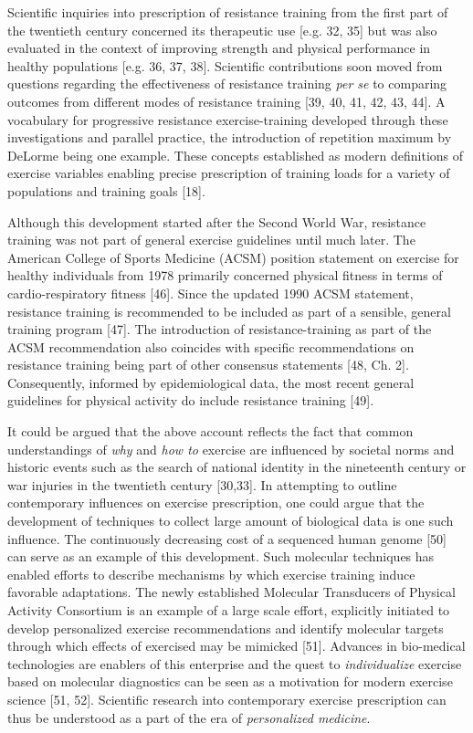 \documentclass[twoside,10pt]{gihclass} %
\begin{document}
Scientific inquiries into prescription of resistance training from the first part of the twentieth century concerned its therapeutic use
{[}e.g. 32, 35{]}
but was also evaluated in the context of improving strength and physical performance in healthy populations
{[}e.g. 36, 37, 38{]}.
Scientific contributions soon moved from questions regarding the effectiveness of resistance training \emph{per se} to comparing outcomes from different modes of resistance training
{[}39, 40, 41, 42, 43, 44{]}.
A vocabulary for progressive resistance exercise-training developed through these investigations and parallel practice,
the introduction of repetition maximum by DeLorme being one example. These concepts established as modern definitions of exercise variables enabling precise prescription of training loads for a variety of populations and training goals
{[}18{]}.

Although this development started after the Second World War, resistance training was not part of general exercise guidelines until much later.
The American College of Sports Medicine (ACSM) position statement on exercise for healthy individuals from 1978 primarily concerned physical fitness in terms of cardio-respiratory fitness
{[}46{]}.
Since the updated 1990 ACSM statement, resistance training is recommended to be included as part of a sensible, general training program
{[}47{]}.
The introduction of resistance-training as part of the ACSM recommendation also coincides with specific recommendations on resistance training being part of other consensus statements
{[}48, Ch. 2{]}.
Consequently, informed by epidemiological data, the most recent general guidelines for physical activity do include resistance training {[}49{]}.

It could be argued that the above account reflects the fact that common understandings of \emph{why} and \emph{how to} exercise are influenced by societal norms and historic events such as the search of national identity in the nineteenth century or war injuries in the twentieth century
{[}30,33{]}.
In attempting to outline contemporary influences on exercise prescription, one could argue that the development of techniques to collect large amount of biological data is one such influence. The continuously decreasing cost of a sequenced human genome
{[}50{]} can serve as an example of this development.
Such molecular techniques has enabled efforts to describe mechanisms by which exercise training induce favorable adaptations. The newly established Molecular Transducers of Physical Activity Consortium is an example of a large scale effort, explicitly initiated to develop personalized exercise recommendations and identify molecular targets through which effects of exercised may be mimicked
{[}51{]}.
Advances in bio-medical technologies are enablers of this enterprise and the quest to \emph{individualize} exercise based on molecular diagnostics can be seen as a motivation for modern exercise science
{[}51, 52{]}.
Scientific research into contemporary exercise prescription can thus be understood as a part of the era of \emph{personalized medicine}.
\end{document}
